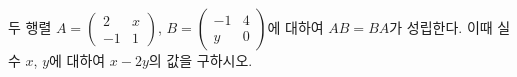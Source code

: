\hspace*{2mm}\begin{minipage}[t]{\dimexpr\linewidth-2mm\relax}\vspace{0pt}
두 행렬 $A=\begin{pmatrix} 2 & x \\ -1 & 1 \end{pmatrix}$, $B=\begin{pmatrix} -1 & 4 \\ y & 0 \end{pmatrix}$에 대하여 $AB=BA$가 성립한다. 이때 실수 $x$, $y$에 대하여 $x-2y$의 값을 구하시오.\end{minipage}

